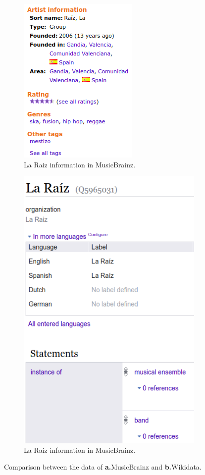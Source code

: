 \begin{figure}[t!]
	\centering
	\begin{subfigure}{0.46\columnwidth}
		\centering
		\includegraphics[width=0.7\linewidth]{images/mb-laraiz.png}
		\caption{La Raiz information in MusicBrainz.}
		\label{subfig:raiz_mb}
	\end{subfigure}
	\begin{subfigure}{0.46\columnwidth}
		\centering
		\includegraphics[width=0.63\linewidth]{images/wd-laraiz.png}
		\caption{La Raiz information in MusicBrainz.}
		\label{subfig:raiz_wd}
	\end{subfigure}

	\caption{Comparison between the data of \textbf{a.}MusicBrainz and \textbf{b.}Wikidata.}
	\label{fig:data-comp}
\end{figure}